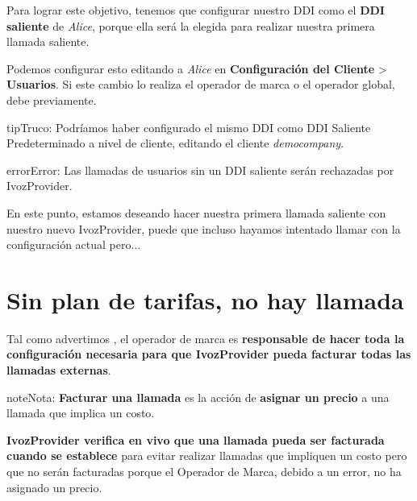 \documentclass[letterpaper,10pt,spanish]{sphinxmanual}
\begin{document}
Para lograr este objetivo, tenemos que configurar nuestro DDI como el \textbf{DDI saliente} de \emph{Alice}, porque ella será la elegida para realizar nuestra primera llamada saliente.

Podemos configurar esto editando a \emph{Alice} en \textbf{Configuración del Cliente} \textgreater{} \textbf{Usuarios}. Si este cambio lo realiza el operador de marca o el operador global, debe {\hyperref[getting_started/internal_calls/brand_portal:emulate\string-client]{}} previamente.

\begin{notice}{tip}{Truco:}
Podríamos haber configurado el mismo DDI como DDI Saliente Predeterminado a nivel de cliente, editando el cliente \emph{democompany}.
\end{notice}

\begin{notice}{error}{Error:}
Las llamadas de usuarios sin un DDI saliente serán rechazadas por IvozProvider.
\end{notice}

En este punto, estamos deseando hacer nuestra primera llamada saliente con nuestro nuevo IvozProvider, puede que incluso hayamos intentado llamar con la configuración actual pero...


\section{Sin plan de tarifas, no hay llamada}
\label{getting_started/external_outgoing_calls/noplan_nocall:no-rating-plan-no-call}\label{getting_started/external_outgoing_calls/noplan_nocall:noplan-nocall}\label{getting_started/external_outgoing_calls/noplan_nocall::doc}
Tal como advertimos {\hyperref[basic_concepts/operation_roles/index:brand\string-responsibilities]{}}, el operador de marca es \textbf{responsable de hacer toda la configuración necesaria para que IvozProvider pueda facturar todas las llamadas externas}.

\begin{notice}{note}{Nota:}
\textbf{Facturar una llamada} es la acción de \textbf{asignar un precio} a una llamada que implica un costo.
\end{notice}

\textbf{IvozProvider verifica en vivo que una llamada pueda ser facturada cuando se establece} para evitar realizar llamadas que impliquen un costo pero que no serán facturadas porque el Operador de Marca, debido a un error, no ha asignado un precio.
\end{document}
